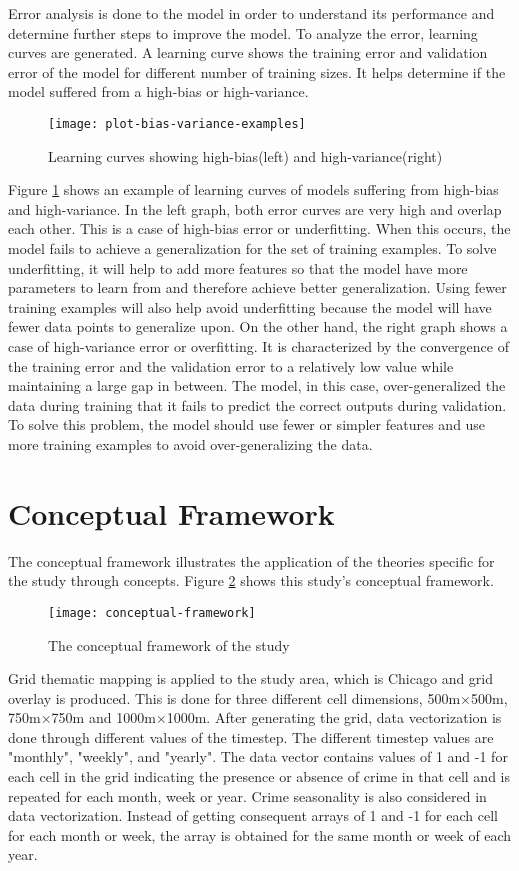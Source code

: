 Error analysis is done to the model in order to understand its performance and determine further steps to improve the model. To analyze the error, learning curves are generated. A learning curve shows the training error and validation error of the model for different number of training sizes. It helps determine if the model suffered from a high-bias or high-variance.
\begin{figure}[H]
    \centering
    \texttt{[image: plot-bias-variance-examples]}
    \caption{Learning curves showing high-bias(left) and high-variance(right) \citep{scikit-learn}}
    \label{fig:learning-curve-sample}
\end{figure}

Figure \ref{fig:learning-curve-sample} shows an example of learning curves of models suffering from high-bias and high-variance. In the left graph, both error curves are very high and overlap each other. This is a case of high-bias error or underfitting. When this occurs, the model fails to achieve a generalization for the set of training examples. To solve underfitting, it will help to add more features so that the model have more parameters to learn from and therefore achieve better generalization. Using fewer training examples will also help avoid underfitting because the model will have fewer data points to generalize upon. On the other hand, the right graph shows a case of high-variance error or overfitting. It is characterized by the convergence of the training error and the validation error to a relatively low value while maintaining a large gap in between. The model, in this case, over-generalized the data during training that it fails to predict the correct outputs during validation. To solve this problem, the model should use fewer or simpler features and use more training examples to avoid over-generalizing the data.

\section{Conceptual Framework}
The conceptual framework illustrates the application of the theories specific for the study through concepts. Figure \ref{fig:conceptual-framework} shows this study's conceptual framework.
\begin{figure}[H]
    \centering
    \texttt{[image: conceptual-framework]}
    \caption{The conceptual framework of the study}
    \label{fig:conceptual-framework}
\end{figure}
Grid thematic mapping is applied to the study area, which is Chicago and grid overlay is produced. This is done for three different cell dimensions, 500m\(\times\)500m, 750m\(\times\)750m and 1000m\(\times\)1000m. After generating the grid, data vectorization is done through different values of the timestep. The different timestep values are "monthly", "weekly", and "yearly". The data vector contains values of 1 and -1 for each cell in the grid indicating the presence or absence of crime in that cell and is repeated for each month, week or year. Crime seasonality is also considered in data vectorization. Instead of getting consequent arrays of 1 and -1 for each cell for each month or week, the array is obtained for the same month or week of each year.

